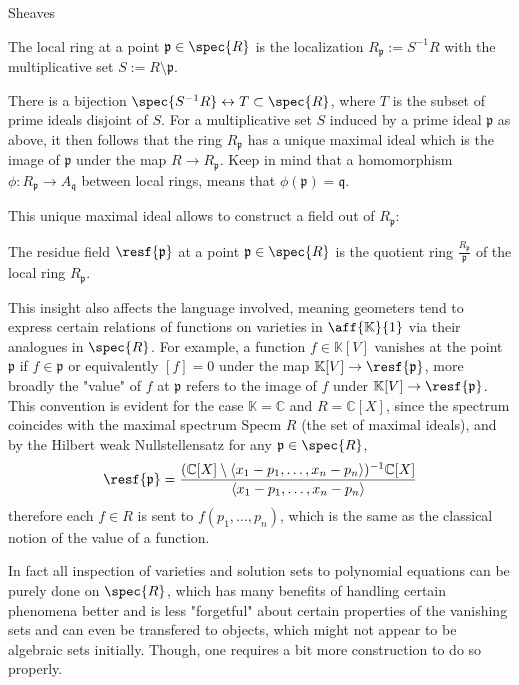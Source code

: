 \begin{section}{Sheaves}
\begin{definition}
    The local ring at a point \( \mathfrak{p} \in \spec{R} \) is the localization \( R_{\mathfrak{p}} := S^{-1} R  \)
    with the multiplicative set \( S := R \setminus \mathfrak{p} \).
\end{definition}
There is a bijection \( \spec{ S^{-1} R } \leftrightarrow T \subset \spec{R} \), where \( T \) is the subset of prime ideals disjoint of \( S \).
For a multiplicative set \( S \) induced by a prime ideal \( \mathfrak{p} \) as above, it then follows that the ring \( R_{\mathfrak{p}} \)
has a unique maximal ideal which is the image of \( \mathfrak{p} \) under the map \( R \to R_{\mathfrak{p}} \).
Keep in mind that a homomorphism \( \phi : R_{\mathfrak{p}} \to A_{\mathfrak{q}} \) between local rings, means that 
\( \phi(\mathfrak{p}) = \mathfrak{q} \).

This unique maximal ideal allows to construct a field out of \( R_{\mathfrak{p}} \):
\begin{definition}
    The residue field \( \resf{\mathfrak{p}} \) at a point \( \mathfrak{p} \in \spec{R} \) is the quotient ring \( \frac{R_{\mathfrak{p}}}{\mathfrak{p}} \) of the local ring \( R_{\mathfrak{p}} \).
\end{definition}
This insight also affects the language involved, meaning geometers tend to express certain relations of functions on varieties in \( \aff{\mathbb{K}}{1} \) via their analogues in \( \spec{R} \). For example, a function \( f \in \mathbb{K}[V] \) vanishes at the point \( \mathfrak{p} \) 
if \( f \in \mathfrak{p} \) or equivalently \( [f] = 0 \) under the map \( \mathbb{K}[V] \to \resf{\mathfrak{p}} \), more broadly the "value" of \( f \)
at \( \mathfrak{p} \) refers to the image of \( f \) under \( \mathbb{K}[V] \to \resf{\mathfrak{p}} \). This convention is evident for the case
\( \mathbb{K} = \mathbb{C} \) and \( R = \mathbb{C}[X] \), since the spectrum coincides with the maximal spectrum 
\( \text{Specm } R \) (the set of maximal ideals), and by the Hilbert weak Nullstellensatz for any \( \mathfrak{p} \in \spec{R} \), 
\[ 
\resf{\mathfrak{p}} = \frac{(\mathbb{C}[X] \setminus \langle x_1 - p_1, \dots, x_n - p_n \rangle)^{-1}\mathbb{C}[X]}{\langle x_1 - p_1, \dots, x_n - p_n \rangle} \]
therefore each \( f \in R \) is sent to \( f(p_1, \dots, p_n) \), which is the same as the classical notion of the value of a function.

In fact all inspection of varieties and solution sets to polynomial equations can be purely done on \( \spec{R} \), which has many benefits 
of handling certain phenomena better and is less "forgetful" about certain properties of the vanishing sets and can even be transfered to objects,
which might not appear to be algebraic sets initially. Though, one requires a bit more construction to do so properly. 


\end{section}
